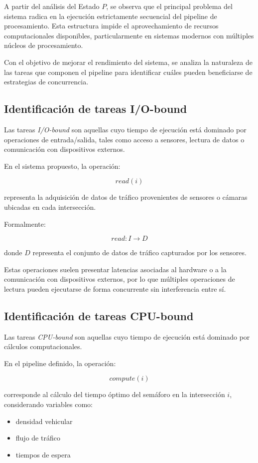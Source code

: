 \documentclass[12pt]{article}
\begin{document}
A partir del análisis del Estado \(P\), se observa que el principal problema del sistema radica en la ejecución estrictamente secuencial del pipeline de procesamiento. Esta estructura impide el aprovechamiento de recursos computacionales disponibles, particularmente en sistemas modernos con múltiples núcleos de procesamiento.

Con el objetivo de mejorar el rendimiento del sistema, se analiza la naturaleza de las tareas que componen el pipeline para identificar cuáles pueden beneficiarse de estrategias de concurrencia.

\subsection{Identificación de tareas I/O-bound}

Las tareas \textit{I/O-bound} son aquellas cuyo tiempo de ejecución está dominado por operaciones de entrada/salida, tales como acceso a sensores, lectura de datos o comunicación con dispositivos externos.

En el sistema propuesto, la operación:

\[
read(i)
\]

representa la adquisición de datos de tráfico provenientes de sensores o cámaras ubicadas en cada intersección.

Formalmente:

\[
read : I \rightarrow D
\]

donde \(D\) representa el conjunto de datos de tráfico capturados por los sensores.

Estas operaciones suelen presentar latencias asociadas al hardware o a la comunicación con dispositivos externos, por lo que múltiples operaciones de lectura pueden ejecutarse de forma concurrente sin interferencia entre sí.

\subsection{Identificación de tareas CPU-bound}

Las tareas \textit{CPU-bound} son aquellas cuyo tiempo de ejecución está dominado por cálculos computacionales.

En el pipeline definido, la operación:

\[
compute(i)
\]

corresponde al cálculo del tiempo óptimo del semáforo en la intersección \(i\), considerando variables como:

\begin{itemize}
\item densidad vehicular
\item flujo de tráfico
\item tiempos de espera
\end{itemize}
\end{document}
